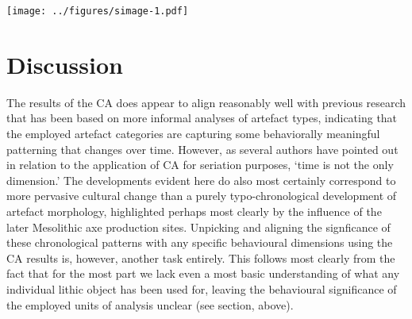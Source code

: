 \documentclass[
]{article}
\begin{document}
\texttt{[image: ../figures/simage-1.pdf]}

\hypertarget{discussion}{%
\section{Discussion}\label{discussion}}

The results of the CA does appear to align reasonably well with previous research that has been based on more informal analyses of artefact types, indicating that the employed artefact categories are capturing some behaviorally meaningful patterning that changes over time. However, as several authors have pointed out in relation to the application of CA for seriation purposes, `time is not the only dimension.' The developments evident here do also most certainly correspond to more pervasive cultural change than a purely typo-chronological development of artefact morphology, highlighted perhaps most clearly by the influence of the later Mesolithic axe production sites. Unpicking and aligning the signficance of these chronological patterns with any specific behavioural dimensions using the CA results is, however, another task entirely. This follows most clearly from the fact that for the most part we lack even a most basic understanding of what any individual lithic object has been used for, leaving the behavioural significance of the employed units of analysis unclear (see section, above).
\end{document}
